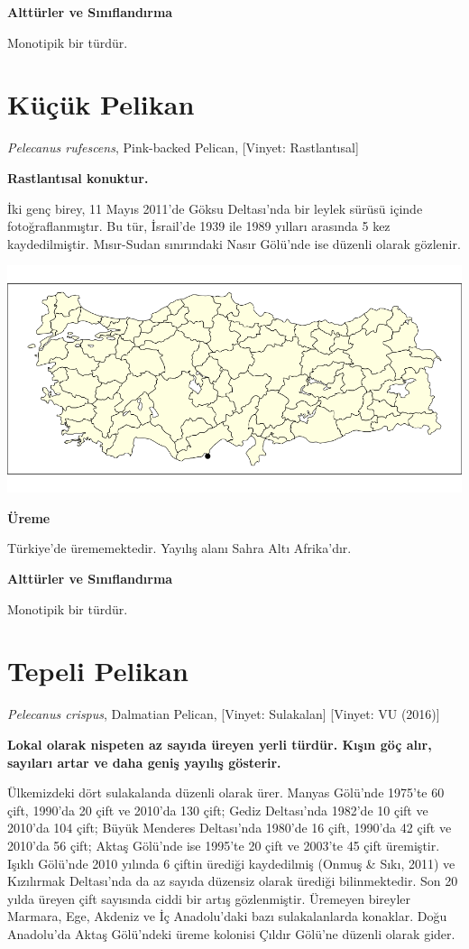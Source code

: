 \documentclass[
  a4paper,
  DIV=11,
  numbers=noendperiod]{scrreprt}
\begin{document}
\textbf{Alttürler ve Sınıflandırma}

Monotipik bir türdür.

\section{Küçük Pelikan}\label{kuxfcuxe7uxfck-pelikan}

\emph{Pelecanus rufescens}, Pink-backed Pelican, {[}Vinyet:
Rastlantısal{]}

\textbf{Rastlantısal konuktur.}

İki genç birey, 11 Mayıs 2011'de Göksu Deltası'nda bir leylek sürüsü
içinde fotoğraflanmıştır. Bu tür, İsrail'de 1939 ile 1989 yılları
arasında 5 kez kaydedilmiştir. Mısır-Sudan sınırındaki Nasır Gölü'nde
ise düzenli olarak gözlenir.

\includegraphics{images/harita_Pelecanus_rufescens.png}

\textbf{Üreme}

Türkiye'de ürememektedir. Yayılış alanı Sahra Altı Afrika'dır.

\textbf{Alttürler ve Sınıflandırma}

Monotipik bir türdür.

\section{Tepeli Pelikan}\label{tepeli-pelikan}

\emph{Pelecanus crispus}, Dalmatian Pelican, {[}Vinyet: Sulakalan{]}
{[}Vinyet: VU (2016){]}

\textbf{Lokal olarak nispeten az sayıda üreyen yerli türdür. Kışın göç
alır, sayıları artar ve daha geniş yayılış gösterir.}

Ülkemizdeki dört sulakalanda düzenli olarak ürer. Manyas Gölü'nde
1975'te 60 çift, 1990'da 20 çift ve 2010'da 130 çift; Gediz Deltası'nda
1982'de 10 çift ve 2010'da 104 çift; Büyük Menderes Deltası'nda 1980'de
16 çift, 1990'da 42 çift ve 2010'da 56 çift; Aktaş Gölü'nde ise 1995'te
20 çift ve 2003'te 45 çift üremiştir. Işıklı Gölü'nde 2010 yılında 6
çiftin ürediği kaydedilmiş (Onmuş \& Sıkı, 2011) ve Kızılırmak
Deltası'nda da az sayıda düzensiz olarak ürediği bilinmektedir. Son 20
yılda üreyen çift sayısında ciddi bir artış gözlenmiştir. Üremeyen
bireyler Marmara, Ege, Akdeniz ve İç Anadolu'daki bazı sulakalanlarda
konaklar. Doğu Anadolu'da Aktaş Gölü'ndeki üreme kolonisi Çıldır Gölü'ne
düzenli olarak gider.
\end{document}
